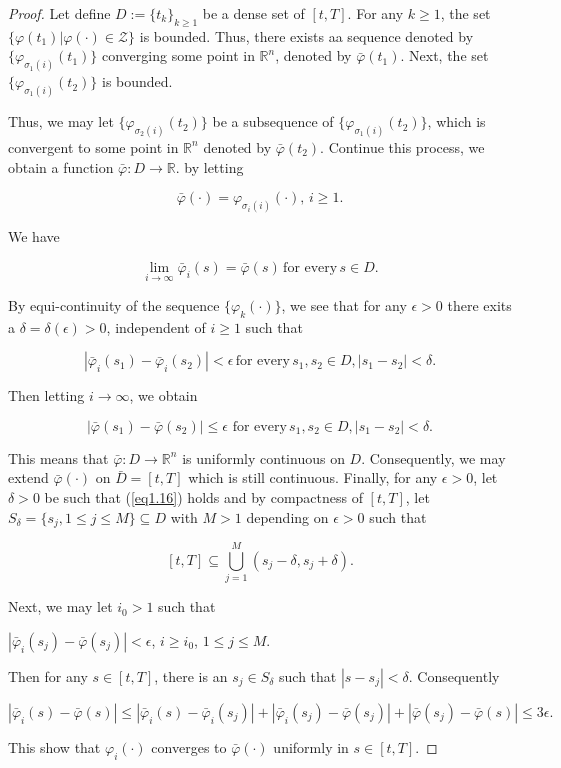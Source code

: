 \begin{proof}
Let define $D:=\{t_k\}_{k\geq 1}$ be a dense set of $[t,T]$. For any $k\geq 1$, the set $\{\varphi(t_1)|\varphi(\cdot)\in \mathcal{Z}\}$ is bounded. Thus, there exists aa sequence denoted by $\{\varphi_{\sigma_1(i)}(t_1)\}$ converging some point in $\mathbb{R}^n$, denoted by $\bar{\varphi}(t_1)$. Next, the set $\{\varphi_{\sigma_1(i)}(t_2)\}$ is bounded.

Thus, we may let $\{\varphi_{\sigma_2(i)}(t_2)\}$ be a subsequence of $\{\varphi_{\sigma_1(i)}(t_2)\}$, which is convergent to some point in $\mathbb{R}^n$ denoted by $\bar{\varphi}(t_2)$. Continue this process, we obtain a function $\bar{\varphi}:D\rightarrow \mathbb{R}$. by letting

$$\bar{\varphi}(\cdot)=\varphi_{\sigma_i(i)}(\cdot),\, i\geq 1.$$

We have 

$$\lim_{i\rightarrow \infty} \bar{\varphi}_i(s)=\bar{\varphi}(s)\,\mbox{for every}\, s\in D.$$

By equi-continuity of the sequence $\{\varphi_k(\cdot)\}$, we see that for any $\epsilon>0$ there exits a $\delta=\delta(\epsilon)>0$, independent of $i\geq 1$ such that

\begin{equation}\label{eq1.16}
	|\bar{\varphi}_i(s_1)-\bar{\varphi}_i(s_2)|<\epsilon\, \mbox{for every}\, s_1,s_2\in D, |s_1-s_2|<\delta.
\end{equation}

Then letting $i\rightarrow \infty$, we obtain

$$|\bar{\varphi}(s_1)-\bar{\varphi}(s_2)|\leq \epsilon\,\, \mbox{for every}\, s_1,s_2\in D, |s_1-s_2|<\delta.$$

This means that $\bar{\varphi}:D\rightarrow \mathbb{R}^n$ is uniformly continuous on $D$. Consequently, we may extend $\bar{\varphi}(\cdot)$ on $\bar{D}=[t,T]$ which is still continuous. Finally, for any $\epsilon>0$, let $\delta>0$ be such that (\ref{eq1.16}) holds and by compactness of $[t,T]$, let $S_{\delta}=\{s_j,1\leq j\leq M\}\subseteq D$ with $M>1$ depending on $\epsilon>0$ such that

$$[t,T]\subseteq \bigcup^M_{j=1}(s_j-\delta,s_j+\delta).$$

Next, we may let $i_0>1$ such that

\begin{center}
	$|\bar{\varphi}_i(s_j)-\bar{\varphi}(s_j)|<\epsilon$, $i\geq i_0$, $1\leq j\leq M$.
\end{center}

Then for any $s\in [t,T]$, there is an $s_j\in S_{\delta}$ such that $|s-s_j|<\delta$. Consequently 

$$|\bar{\varphi}_i(s)-\bar{\varphi}(s)|\leq |\bar{\varphi}_i(s)-\bar{\varphi}_i(s_j)|+|\bar{\varphi}_i(s_j)-\bar{\varphi}(s_j)|+|\bar{\varphi}(s_j)-\bar{\varphi}(s)|\leq 3\epsilon.$$

This show that $\varphi_i(\cdot)$ converges to $\bar{\varphi} (\cdot)$ uniformly  in $s\in [t,T]$.
\end{proof}

